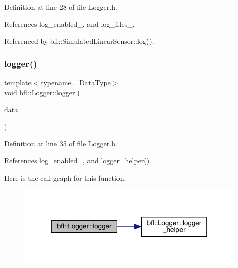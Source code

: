 Definition at line 28 of file Logger.\+h.



References log\+\_\+enabled\+\_\+, and log\+\_\+files\+\_\+.



Referenced by bfl\+::\+Simulated\+Linear\+Sensor\+::log().

\mbox{\label{classbfl_1_1Logger_aca2086c9256e5c404872b91f7f25b97d}} 
\subsubsection{\texorpdfstring{logger()}{logger()}\hspace{0.1cm}{\footnotesize\ttfamily [2/4]}}
{\footnotesize\ttfamily template$<$typename... Data\+Type$>$ \\
void bfl\+::\+Logger\+::logger (\begin{DoxyParamCaption}\item[{Data\+Type...}]{data }\end{DoxyParamCaption})\hspace{0.3cm}{\ttfamily [inline]}}



Definition at line 35 of file Logger.\+h.



References log\+\_\+enabled\+\_\+, and logger\+\_\+helper().

Here is the call graph for this function\+:
\nopagebreak
\begin{figure}[H]
\begin{center}
\leavevmode
\includegraphics[width=309pt]{classbfl_1_1Logger_aca2086c9256e5c404872b91f7f25b97d_cgraph}
\end{center}
\end{figure}
\mbox{\label{classbfl_1_1Logger_a50b1c109730fa98f66e66f420f0158fe}} 
